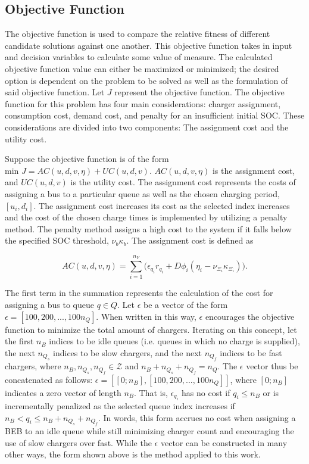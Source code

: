 \documentclass[11pt,a4paper,final]{article}
\newcommand{\AC}{AC(u, d, v, \eta)}         %
\newcommand{\UC}{UC(u, d, v)}               %
\begin{document}
\subsection{Objective Function}
\label{sec:objective-function}
The objective function is used to compare the relative fitness of different candidate solutions against one another.
This objective function takes in input and decision variables to calculate some value of measure. The calculated
objective function value can either be maximized or minimized; the desired option is dependent on the problem to be
solved as well as the formulation of said objective function. Let \(J\) represent the objective function. The objective
function for this problem has four main considerations: charger assignment, consumption cost, demand cost, and penalty
for an insufficient initial SOC. These considerations are divided into two components: The assignment cost and the
utility cost.

Suppose the objective function is of the form \(\text{min } J = \AC + \UC\). \(\AC\) is the assignment cost, and \(\UC\) is
the utility cost. The assignment cost represents the costs of assigning a bus to a particular queue as well as the
chosen charging period, \([u_i, d_i]\). The assignment cost increases its cost as the selected index increases and the
cost of the chosen charge times is implemented by utilizing a penalty method. The penalty method assigns a high cost to
the system if it falls below the specified SOC threshold, \(\nu_b \kappa_b\). The assignment cost is defined as

\begin{equation}
\label{eq:ac}
\AC = \sum_{i=1}^{n_V} \Big(\epsilon_{q_i}r_{q_i} + D \phi_i(\eta_i - \nu_{\Xi_i} \kappa_{\Xi_i}) \Big)\text{.}
\end{equation}

The first term in the summation represents the calculation of the cost for assigning a bus to queue \(q \in Q\). Let \(\epsilon\) be
a vector of the form \(\epsilon = [100, 200, ..., 100n_Q]\). When written in this way, \(\epsilon\) encourages the objective function to
minimize the total amount of chargers. Iterating on this concept, let the first \(n_B\) indices to be idle queues (i.e.
queues in which no charge is supplied), the next \(n_{Q_s}\) indices to be slow chargers, and the next \(n_{Q_f}\) indices
to be fast chargers, where \(n_B, n_{Q_s}, n_{Q_f} \in \mathcal{Z}\) and \(n_B + n_{Q_s} + n_{Q_f} = n_Q\). The \(\epsilon\) vector thus be
concatenated as follows: \(\epsilon = [[0; n_B], [100, 200, ..., 100n_Q]]\), where \([0; n_B]\) indicates a zero vector of length
\(n_B\). That is, \(\epsilon_{q_i}\) has no cost if \(q_i \le n_B\) or is incrementally penalized as the selected queue index increases
if \(n_B < q_i \le n_B + n_{Q_s} + n_{Q_f}\). In words, this form accrues no cost when assigning a BEB to an idle queue
while still minimizing charger count and encouraging the use of slow chargers over fast. While the \(\epsilon\) vector can be
constructed in many other ways, the form shown above is the method applied to this work.
\end{document}

